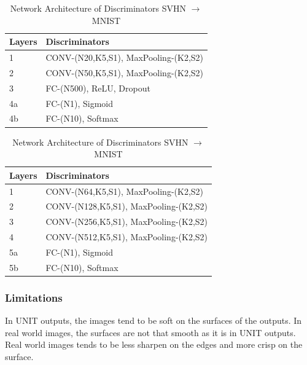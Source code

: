 \begin{table}[htbp]
\caption{Network Architecture of Discriminators MNIST $\rightarrow$ USPS}
\label{UNIT1}
\begin{tabular}{ll}
\hline
Layers & Discriminators\\
\hline
\hline
1 & CONV-(N20,K5,S1), MaxPooling-(K2,S2) \\
2 & CONV-(N50,K5,S1), MaxPooling-(K2,S2) \\
3 & FC-(N500), ReLU, Dropout \\
4a & FC-(N1), Sigmoid \\
4b & FC-(N10), Softmax \\

\hline
\hline

\end{tabular}
\caption{Network Architecture of Discriminators SVHN $\rightarrow$ MNIST}
\label{UNIT1}
\begin{tabular}{ll}
\hline
Layers & Discriminators\\
\hline
\hline
1 & CONV-(N64,K5,S1), MaxPooling-(K2,S2) \\
2 & CONV-(N128,K5,S1), MaxPooling-(K2,S2) \\
3 & CONV-(N256,K5,S1), MaxPooling-(K2,S2) \\
4 & CONV-(N512,K5,S1), MaxPooling-(K2,S2) \\
5a & FC-(N1), Sigmoid \\
5b & FC-(N10), Softmax \\

\hline
\hline

\end{tabular}

\end{table}

\subsubsection{Limitations}
In UNIT\cite{DBLP:journals/corr/LiuBK17} outputs, the images tend to be soft on the surfaces of the outputs. In real world images, the surfaces are not that smooth as it is in UNIT outputs. Real world images tends to be less sharpen on the edges and more crisp on the surface.  

